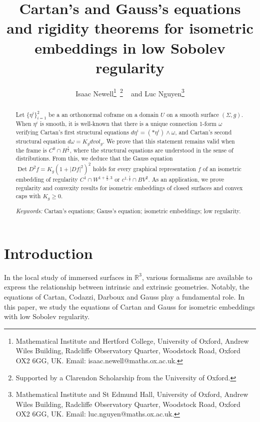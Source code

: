 \documentclass[12pt]{article}
\title{Cartan's and Gauss's equations and rigidity theorems for isometric embeddings in low Sobolev regularity}
\author{Isaac Newell\thanks{Mathematical Institute and Hertford College, University of Oxford, Andrew Wiles Building, Radcliffe Observatory Quarter, Woodstock Road, Oxford OX2 6GG, UK. Email: isaac.newell@maths.ox.ac.uk.}~\thanks{Supported by a Clarendon Scholarship from the University of Oxford.} ~ and Luc Nguyen\thanks{Mathematical Institute and St Edmund Hall, University of Oxford, Andrew Wiles Building, Radcliffe Observatory Quarter, Woodstock Road, Oxford OX2 6GG, UK. Email: luc.nguyen@maths.ox.ac.uk.}}
\date{}
\newcommand{\R}{\mathbb{R}}
\newcommand{\Det}{\operatorname{Det}}
\theoremstyle{plain}
\numberwithin{equation}{section}
\begin{document}
\maketitle
\begin{abstract}
    Let $\{\eta^i\}_{i=1}^2$ be a an orthonormal coframe on a domain $U$ on a smooth surface $(\Sigma,g)$. When $\eta^i$ is smooth, it is well-known that there is a unique connection 1-form $\omega$ verifying Cartan's first structural equations  $d\eta^i = (*\eta^i) \wedge \omega$, and Cartan's second structural equation $d\omega = K_g dvol_g$. We prove that this statement remains valid when the frame is $C^0 \cap H^{\frac12}$, where the structural equations are understood in the sense of distributions. From this, we deduce that the Gauss equation $\Det D^2 f = K_g (1+|Df|^2)^2$ holds for every graphical representation $f$ of an isometric embedding of regularity $C^1 \cap W^{1+\frac23,3}$ or $c^{1,\frac12} \cap BV^2$. As an application, we prove regularity and convexity results for isometric embeddings of closed surfaces and convex caps with $K_g \geq 0$. 
    
    {\it Keywords:} Cartan's equations; Gauss's equation; isometric embeddings; low regularity.
\end{abstract}

\setcounter{tocdepth}{1}
\tableofcontents

\section{Introduction}
In the local study of immersed surfaces in $\R^3$, various formalisms are available to express the relationship between intrinsic and extrinsic geometries. Notably, the equations of Cartan, Codazzi, Darboux and Gauss  play a fundamental role. In this paper, we study the equations of Cartan and Gauss for isometric embeddings with low Sobolev regularity.
\end{document}
